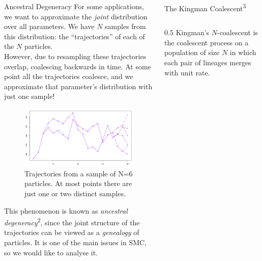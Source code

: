 \documentclass[final, 12pt]{beamer}
\newlength{\colwidth}
\begin{document}
\begin{frame}
\begin{columns}
\begin{column}{\colwidth}
\begin{block}{Ancestral Degeneracy}
For some applications, we want to approximate the \emph{joint} distribution over all parameters.
We have $N$ samples from this distribution: the ``trajectories'' of each of the $N$ particles.\\[12pt]

However, due to resampling these trajectories overlap, coalescing backwards in time. At some point all the trajectories coalesce, and we approximate that parameter's distribution with just one sample!

\begin{figure} %
\includegraphics[width=0.9\colwidth]{../degeneracy.pdf}
\caption{Trajectories from a sample of N=6 particles. At most points there are just one or two distinct samples.}
\end{figure}

This phenomenon is known as \emph{ancestral degeneracy}\textsuperscript{2}, since the joint structure of the trajectories can be viewed as a \emph{genealogy} of particles. It is one of the main issues in SMC, so we would like to analyse it.
\end{block}
\end{column}

\begin{column}{\colwidth}
\vspace*{5pt}

\begin{block}{The Kingman Coalescent\textsuperscript{3}}
\begin{columns}
\begin{column}{0.5\colwidth}
Kingman's $N$-coalescent is the coalescent process on a population of size $N$ in which each pair of lineages merges with unit rate.\\[12pt]


\end{column}
\end{columns}
\end{block}
\end{column}
\end{columns}
\end{frame}
\end{document}
